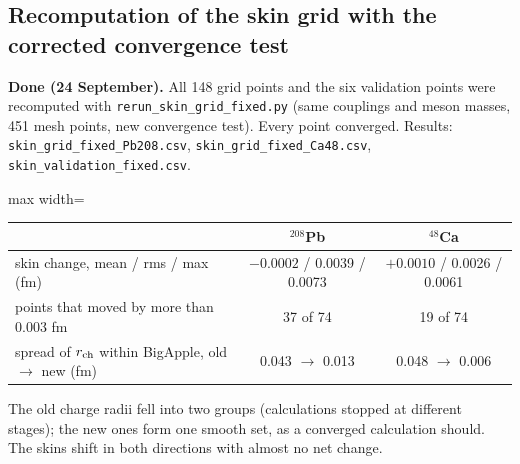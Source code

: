 \documentclass[11pt,a4paper]{article}
\begin{document}
\subsection{Recomputation of the skin grid with the corrected convergence test}\label{sec:rerun}
\textbf{Done (24 September).} All 148 grid points and the six validation points were recomputed with \texttt{rerun\_skin\_grid\_fixed.py} (same couplings and meson masses, 451 mesh points, new convergence test). Every point converged. Results: \texttt{skin\_grid\_fixed\_Pb208.csv}, \texttt{skin\_grid\_fixed\_Ca48.csv}, \texttt{skin\_validation\_fixed.csv}.

\begin{center}
\begin{adjustbox}{max width=\linewidth}
\begin{tabular}{lcc}
\toprule
 & $^{208}$Pb & $^{48}$Ca\\
\midrule
skin change, mean / rms / max (fm) & $-0.0002$ / 0.0039 / 0.0073 & $+0.0010$ / 0.0026 / 0.0061\\
points that moved by more than 0.003 fm & 37 of 74 & 19 of 74\\
spread of $r_{\rm ch}$ within BigApple, old $\to$ new (fm) & 0.043 $\to$ 0.013 & 0.048 $\to$ 0.006\\
\bottomrule
\end{tabular}
\end{adjustbox}
\end{center}
The old charge radii fell into two groups (calculations stopped at different stages); the new ones form one smooth set, as a converged calculation should. The skins shift in both directions with almost no net change.
\end{document}
